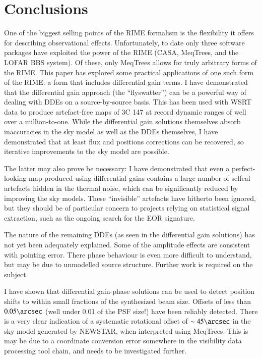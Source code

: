 \documentclass{aa}
\begin{document}
\section{Conclusions}

One of the biggest selling points of the RIME formalism is the flexibility it offers for describing observational effects. Unfortunately, to date only three software packages have exploited the power of the RIME (CASA, MeqTrees, and the LOFAR BBS system). Of these, only MeqTrees allows for truly arbitrary forms of the RIME. This paper has explored some practical applications of one such form of the RIME: a form that includes differential gain terms. I have demonstrated that the differential gain approach (the ``flyswatter'') can be a powerful way of dealing with DDEs on a source-by-source basis. This has been used with WSRT data to produce artefact-free maps of 3C 147 at record dynamic ranges of well over a million-to-one. While the differential gain solutions themselves absorb inaccuracies in the sky model as well as the DDEs themselves, I have demonstrated that at least flux and positions corrections can be recovered, so iterative improvements to the sky model are possible. 

The latter may also prove be necessary: I have demonstrated that even a perfect-looking map produced using differential gains contains a large number of selfcal artefacts hidden in the thermal noise, which can be significantly reduced by improving the sky models. These ``invisible'' artefacts have hitherto been ignored, but they should be of particular concern to projects relying on statistical signal extraction, such as the ongoing search for the EOR signature.

The nature of the remaining DDEs (as seen in the differential gain solutions) has not yet been adequately explained. Some of the amplitude effects are consistent with pointing error. There phase behaviour is even more difficult to understand, but may be due to unmodelled source structure. Further work is required on the subject. 

I have shown that differential gain-phase solutions can be used to detect position shifts to within small fractions of the synthesized beam size. Offsets of less than $0.05\arcsec$ (well under 0.01 of the PSF size!) have been reliably detected. There is a very clear indication of a systematic rotational offset of $\sim45\arcsec$ in the sky model generated by NEWSTAR, when interpreted using MeqTrees. This is may be due to a coordinate conversion error somewhere in the visibility data processing tool chain, and needs to be investigated further.
\end{document}
